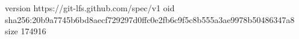 version https://git-lfs.github.com/spec/v1
oid sha256:20b9a7745b6bd8aecf729297d0ffc0e2fb6c9f5c8b555a3ae9978b50486347a8
size 174916
